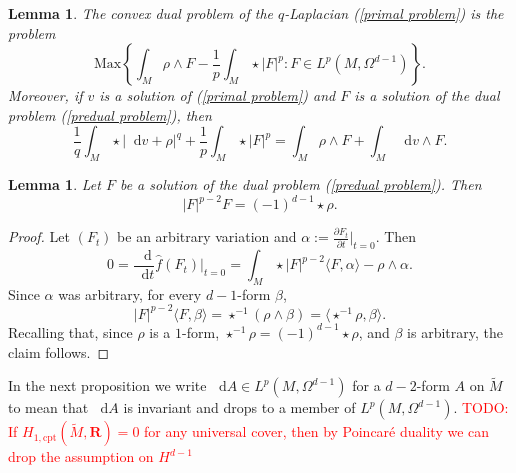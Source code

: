 \documentclass[reqno,11pt]{amsart}
\newcommand{\RR}{\mathbf{R}}
\newcommand*\dif{\mathop{}\!\mathrm{d}}
\newcommand{\Max}{\mathrm{Max}}
\newcommand{\cpt}{\mathrm{cpt}}
\newtheorem{lemma}[theorem]{Lemma}
\theoremstyle{definition}
\numberwithin{equation}{section}
\newcommand\todo[1]{\textcolor{red}{TODO: #1}}
\begin{document}
\begin{lemma}
The convex dual problem of the $q$-Laplacian (\ref{primal problem}) is the problem 
\begin{equation}\label{predual problem}
\Max\left\{\int_M \rho \wedge F - \frac{1}{p} \int_M \star |F|^p: F \in L^p(M, \Omega^{d - 1})\right\}.
\end{equation}
Moreover, if $v$ is a solution of (\ref{primal problem}) and $F$ is a solution of the dual problem (\ref{predual problem}), then
\begin{equation}\label{extremality relations}
\frac{1}{q} \int_M \star |\dif v + \rho|^q + \frac{1}{p} \int_M \star |F|^p = \int_M \rho \wedge F + \int_M \dif v \wedge F.
\end{equation}
\end{lemma}

\begin{lemma}
Let $F$ be a solution of the dual problem (\ref{predual problem}). Then
\begin{equation}\label{EL of hat G}
|F|^{p - 2} F = (-1)^{d - 1} \star \rho.
\end{equation}
\end{lemma}
\begin{proof}
Let $(F_t)$ be an arbitrary variation and $\alpha := \frac{\partial F_t}{\partial t}|_{t = 0}$. Then 
$$0 = \frac{\dif}{\dif t} \hat f(F_t)\bigg|_{t = 0} = \int_M \star |F|^{p - 2} \langle F, \alpha \rangle - \rho \wedge \alpha.$$
Since $\alpha$ was arbitrary, for every $d-1$-form $\beta$,
$$|F|^{p - 2} \langle F, \beta\rangle = \star^{-1}(\rho \wedge \beta) = \langle \star^{-1} \rho, \beta\rangle.$$
Recalling that, since $\rho$ is a $1$-form, $\star^{-1} \rho = (-1)^{d - 1} \star \rho$, and $\beta$ is arbitrary, the claim follows.
\end{proof}

In the next proposition we write $\dif A \in L^p(M, \Omega^{d - 1})$ for a $d-2$-form $A$ on $\tilde M$ to mean that $\dif A$ is invariant and drops to a member of $L^p(M, \Omega^{d - 1})$.
\todo{If $H_{1, \cpt}(\tilde M, \RR) = 0$ for any universal cover, then by Poincar\'e duality we can drop the assumption on $H^{d - 1}$}
\end{document}
